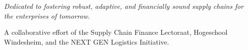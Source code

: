 \begin{center}
    \thispagestyle{empty}
    \vspace*{\fill} %
    
    \Large %
    \textit{Dedicated to fostering robust, adaptive, and financially sound supply chains for the enterprises of tomorrow.}
    
    \vspace{2em} %
    
    \normalsize %
    A collaborative effort of the Supply Chain Finance Lectoraat, Hogeschool Windesheim, and the NEXT GEN Logistics Initiative.
    
    \vspace*{\fill} %
\end{center}